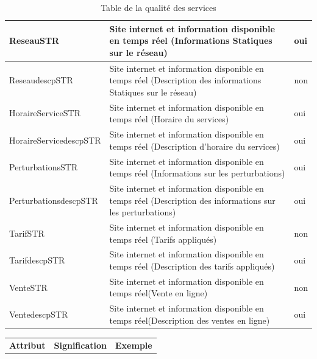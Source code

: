 \documentclass[a4paper]{report}
\begin{document}
\begin{doublespace}
\begin{table}[H]
\begin{center}
\begin{tabularx}{17.5cm}{|p{4cm}|X|p{2.5cm}|}
				\hline
				ReseauSTR                 & Site internet et information disponible  en temps réel (Informations Statiques sur le réseau)                 & oui              \\
				\hline
				ReseaudescpSTR            & Site internet et information disponible  en temps réel (Description des informations Statiques sur le réseau) & non              \\
				\hline
				HoraireServiceSTR         & Site internet et information disponible  en temps réel (Horaire du services)                                  & oui              \\
				\hline
				HoraireServicedescpSTR    & Site internet et information disponible  en temps réel (Description d'horaire du services)                    & oui              \\
				\hline
				PerturbationsSTR          & Site internet et information disponible  en temps réel (Informations sur les perturbations)                   & oui              \\
				\hline
				PerturbationsdescpSTR     & Site internet et information disponible  en temps réel (Description des informations sur les perturbations)   & oui              \\
				\hline
				TarifSTR                  & Site internet et information disponible  en temps réel (Tarifs appliqués)                                     & non              \\
				\hline
				TarifdescpSTR             & Site internet et information disponible  en temps réel (Description des tarifs appliqués)                     & oui              \\
				\hline
				VenteSTR                  & Site internet et information disponible  en temps réel(Vente en ligne)                                        & non              \\
				\hline
				VentedescpSTR             & Site internet et information disponible  en temps réel(Description des ventes en ligne)                       & oui              \\
				\hline
			\end{tabularx}
			\caption{Table de la qualité des services}
		\end{center}
	\end{table}
	\begin{table}[H]
		\begin{center}
			\begin{tabularx}{17.5cm}{|p{4cm}|X|p{2.5cm}|}
				\hline
				\textbf{Attribut}                       & \textbf{Signification}                                                 & \textbf{Exemple} \\

\end{tabularx}
\end{center}
\end{table}
\end{doublespace}
\end{document}
